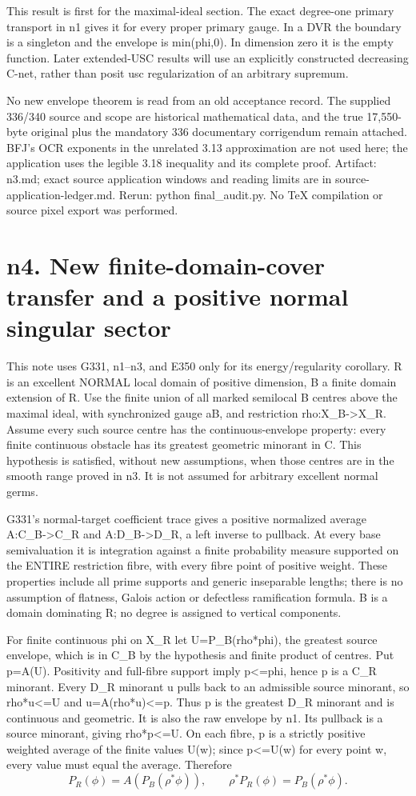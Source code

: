 \documentclass[11pt]{article}
\begin{document}
This result is first for the maximal-ideal section. The exact degree-one primary transport in n1 gives it for every proper primary gauge. In a DVR the boundary is a singleton and the envelope is min(phi,0). In dimension zero it is the empty function. Later extended-USC results will use an explicitly constructed decreasing C-net, rather than posit usc regularization of an arbitrary supremum.

No new envelope theorem is read from an old acceptance record. The supplied 336/340 source and scope are historical mathematical data, and the true 17,550-byte original plus the mandatory 336 documentary corrigendum remain attached. BFJ's OCR exponents in the unrelated 3.13 approximation are not used here; the application uses the legible 3.18 inequality and its complete proof. Artifact: n3.md; exact source application windows and reading limits are in source-application-ledger.md. Rerun: python final\_audit.py. No TeX compilation or source pixel export was performed.

\section{n4. New finite-domain-cover transfer and a positive normal singular sector}

This note uses G331, n1--n3, and E350 only for its energy/regularity corollary. R is an excellent NORMAL local domain of positive dimension, B a finite domain extension of R. Use the finite union of all marked semilocal B centres above the maximal ideal, with synchronized gauge aB, and restriction rho:X\_B->X\_R. Assume every such source centre has the continuous-envelope property: every finite continuous obstacle has its greatest geometric minorant in C. This hypothesis is satisfied, without new assumptions, when those centres are in the smooth range proved in n3. It is not assumed for arbitrary excellent normal germs.

G331's normal-target coefficient trace gives a positive normalized average A:C\_B->C\_R and A:D\_B->D\_R, a left inverse to pullback. At every base semivaluation it is integration against a finite probability measure supported on the ENTIRE restriction fibre, with every fibre point of positive weight. These properties include all prime supports and generic inseparable lengths; there is no assumption of flatness, Galois action or defectless ramification formula. B is a domain dominating R; no degree is assigned to vertical components.

For finite continuous phi on X\_R let U=P\_B(rho*phi), the greatest source envelope, which is in C\_B by the hypothesis and finite product of centres. Put p=A(U). Positivity and full-fibre support imply p<=phi, hence p is a C\_R minorant. Every D\_R minorant u pulls back to an admissible source minorant, so rho*u<=U and u=A(rho*u)<=p. Thus p is the greatest D\_R minorant and is continuous and geometric. It is also the raw envelope by n1. Its pullback is a source minorant, giving rho*p<=U. On each fibre, p is a strictly positive weighted average of the finite values U(w); since p<=U(w) for every point w, every value must equal the average. Therefore
\[
P_R(\phi)=A(P_B(\rho^*\phi)),\qquad
\rho^*P_R(\phi)=P_B(\rho^*\phi).
\]
\end{document}
